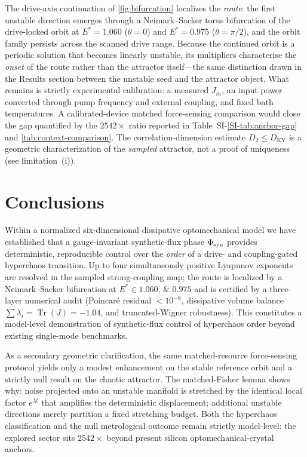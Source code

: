 \documentclass[Phys]{SciPost}
\begin{document}
The drive-axis continuation of \cref{fig:bifurcation} localizes the \emph{route}: the first unstable direction emerges through a Neimark--Sacker torus bifurcation of the drive-locked orbit at $E^{*}=\num{1.060}$ ($\theta=0$) and $E^{*}=\num{0.975}$ ($\theta=\pi/2$), and the orbit family persists across the scanned drive range. Because the continued orbit is a periodic solution that becomes linearly unstable, its multipliers characterise the \emph{onset} of the route rather than the attractor itself---the same distinction drawn in the Results section between the unstable seed and the attractor object. What remains is strictly experimental calibration: a measured $J_m$, an input power converted through pump frequency and external coupling, and fixed bath temperatures. A calibrated-device matched force-sensing comparison would close the gap quantified by the $\num{2542}\times$ ratio reported in Table~SI-\ref{SI-tab:anchor-gap} and \cref{tab:context-comparison}. The correlation-dimension estimate $D_2\le D_{\mathrm{KY}}$ is a geometric characterization of the \emph{sampled} attractor, not a proof of uniqueness (see limitation~(i)).


\section{Conclusions}

Within a normalized six-dimensional dissipative optomechanical model we have established that a gauge-invariant synthetic-flux phase $\Phi_{\rm syn}$ provides deterministic, reproducible control over the \emph{order} of a drive- and coupling-gated hyperchaos transition. Up to four simultaneously positive Lyapunov exponents are resolved in the sampled strong-coupling map; the route is localized by a Neimark--Sacker bifurcation at $E^{*}\in\numlist{1.060;0.975}$ and is certified by a three-layer numerical audit (Poincar\'e residual $<10^{-8}$, dissipative volume balance $\sum\lambda_i=\operatorname{Tr}(J)=-1.04$, and truncated-Wigner robustness). This constitutes a model-level demonstration of synthetic-flux control of hyperchaos order beyond existing single-mode benchmarks.

As a secondary geometric clarification, the same matched-resource force-sensing protocol yields only a modest enhancement on the stable reference orbit and a strictly null result on the chaotic attractor. The matched-Fisher lemma shows why: noise projected onto an unstable manifold is stretched by the identical local factor $e^{\lambda t}$ that amplifies the deterministic displacement; additional unstable directions merely partition a fixed stretching budget. Both the hyperchaos classification and the null metrological outcome remain strictly model-level: the explored sector sits $\num{2542}\times$ beyond present silicon optomechanical-crystal anchors.
\end{document}
